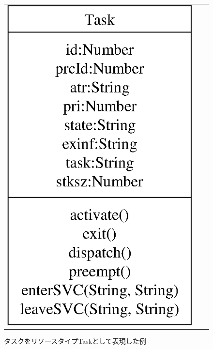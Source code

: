 \begin{figure}[h]
\begin{tabular}{ccc}
\begin{minipage}{0.35\hsize}
\begin{center}
\includegraphics[scale=0.5]{img/resourceTypeSampleByTask.eps}
\caption{タスクをリソースタイプTaskとして表現した例}
\label{fig:resourceTypeSampleByTask}
\end{center}
\end{minipage}
\begin{minipage}{0.25\hsize}

\end{minipage}
\end{tabular}
\end{figure}
